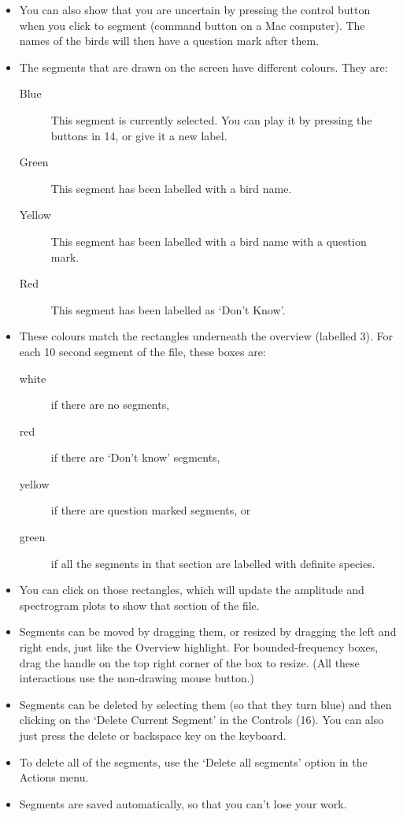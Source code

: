 \documentclass{article}
\begin{document}
\begin{itemize}
\item You can also show that you are uncertain by pressing the control button when you click to segment (command button on a Mac computer). The names of the birds will then have a question mark after them. 

\item The segments that are drawn on the screen have different colours. They are:
	\begin{description} 
	\item[Blue] This segment is currently selected. You can play it by pressing the buttons in 14, or give it a new label. 
	\item[Green] This segment has been labelled with a bird name.
	\item[Yellow] This segment has been labelled with a bird name with a question mark.
	\item[Red] This segment has been labelled as `Don't Know'.
	\end{description}

\item These colours match the rectangles underneath the overview (labelled 3). For each 10 second segment of the file, these boxes are:

	\begin{description} 
 	\item[white] if there are no segments, 
	\item[red] if there are `Don't know' segments, 
	\item[yellow] if there are question marked segments, or 
	\item[green] if all the segments in that section are labelled with definite species. 
	\end{description}
	
\item You can click on those rectangles, which will update the amplitude and spectrogram plots to show that section of the file.  

\item Segments can be moved by dragging them, or resized by dragging the left and right ends, just like the Overview highlight. For bounded-frequency boxes, drag the handle on the top right corner of the box to resize. (All these interactions use the non-drawing mouse button.)

\item Segments can be deleted by selecting them (so that they turn blue) and then clicking on the `Delete Current Segment' in the Controls (16). You can also just press the delete or backspace key on the keyboard. 

\item To delete all of the segments, use the `Delete all segments' option in the Actions menu. 

\item Segments are saved automatically, so that you can't lose your work.

\end{itemize}
\end{document}
